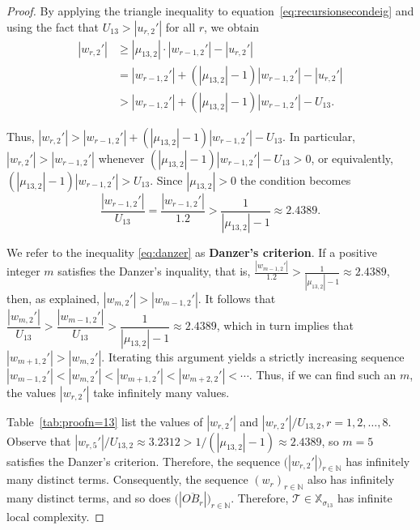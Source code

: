 \begin{proof}
By applying the triangle inequality to equation~\ref{eq:recursionsecondeig} and using the fact that $U_{13}> |u_{r,2}'|$ for all $r$, we obtain
\begin{align*}
|w_{r,2}'| &\geq |\mu_{13,2}| \cdot |w_{r-1,2}'| - |u_{r,2}'| \\
&= |w_{r-1,2}'| + (|\mu_{13,2}| - 1) |w_{r-1,2}'| - |u_{r,2}'|\\
&> |w_{r-1,2}'| + (|\mu_{13,2}| - 1) |w_{r-1,2}'| - U_{13}. \label{eq:triangle_ineq}
\end{align*}

Thus, $|w_{r,2}'| >|w_{r-1,2}'|+(|\mu_{13,2}| - 1) |w_{r-1,2}'| - U_{13}.$ In particular, 
$|w_{r,2}'|>|w_{r-1,2}'|$ whenever $(|\mu_{13,2}| - 1) |w_{r-1,2}'| - U_{13}>0$, or equivalently, $(|\mu_{13,2}| - 1) |w_{r-1,2}'| >U_{13}$. Since $|\mu_{13,2}|>0$ the condition becomes
\begin{equation}
\label{eq:danzer}
\frac{|w_{r-1,2}'|}{U_{13}} = \frac{|w_{r-1,2}'|}{1.2} > \frac{1}{|\mu_{13,2}| - 1} \approx 2.4389.
\end{equation}

We refer to the inequality \ref{eq:danzer} as \textbf{Danzer’s criterion}. If a positive integer $m$ satisfies the Danzer's inquality, that is,  $\frac{|w_{m-1,2}'|}{1.2} > \frac{1}{|\mu_{13,2}| - 1}\approx 2.4389$, then, as explained, $|w_{m,2}'|>|w_{m-1,2}'|$. It follows that $\dfrac{|w_{m,2}'|}{U_{13}}>\dfrac{|w_{m-1,2}'|}{U_{13}}> \dfrac{1}{|\mu_{13,2}| - 1} \approx 2.4389$, which in turn implies that $|w_{m+1,2}'|>|w_{m,2}'|$. Iterating this argument yields a strictly increasing sequence
$|w_{m-1,2}'| < |w_{m,2}'| < |w_{m+1,2}'| < |w_{m+2,2}'| < \cdots.$ Thus, if we can find such an $m$, the values $|w_{r,2}'|$ take infinitely many values.

Table~\ref{tab:proofn=13} list the values of $|w_{r,2}'|$ and $|w_{r,2}'|/U_{13,2}, r=1,2, \ldots ,8.$ Observe that $|w_{r,5}'|/U_{13,2} \approx 3.2312 >1/ (|\mu_{13,2}|-1) \approx 2.4389$, so $m=5$ satisfies the Danzer's criterion. Therefore, the sequence  $\big(|w_{r,2}'|\big)_{r \in \mathbb{N}}$ has infinitely many distinct terms. Consequently, the sequence $(w_r)_{r \in \mathbb{N}}$ also has infinitely many distinct terms, and so does $\big(|\overline{OB_r}|\big)_{r \in \mathbb{N}}$. Therefore, $\mathcal{T} \in \mathbb{X}_{\sigma_{13}}$ has infinite local complexity.



\end{proof}
